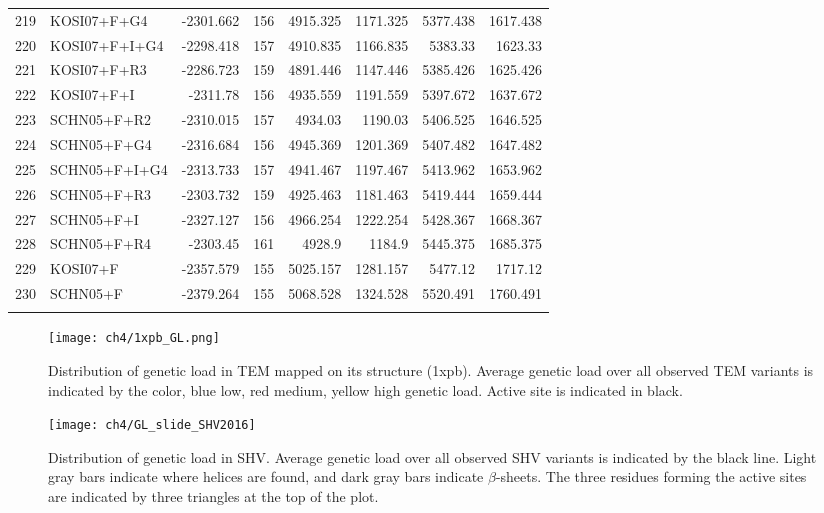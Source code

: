 \begin{longtable}{clrrrrrr}
	219 & KOSI07+F+G4 & -2301.662 & 156 & 4915.325 & 1171.325 & 5377.438 & 1617.438 \\ 
	220 & KOSI07+F+I+G4 & -2298.418 & 157 & 4910.835 & 1166.835 & 5383.33 & 1623.33 \\ 
	221 & KOSI07+F+R3 & -2286.723 & 159 & 4891.446 & 1147.446 & 5385.426 & 1625.426 \\ 
	222 & KOSI07+F+I & -2311.78 & 156 & 4935.559 & 1191.559 & 5397.672 & 1637.672 \\ 
	223 & SCHN05+F+R2 & -2310.015 & 157 & 4934.03 & 1190.03 & 5406.525 & 1646.525 \\ 
	224 & SCHN05+F+G4 & -2316.684 & 156 & 4945.369 & 1201.369 & 5407.482 & 1647.482 \\ 
	225 & SCHN05+F+I+G4 & -2313.733 & 157 & 4941.467 & 1197.467 & 5413.962 & 1653.962 \\ 
	226 & SCHN05+F+R3 & -2303.732 & 159 & 4925.463 & 1181.463 & 5419.444 & 1659.444 \\ 
	227 & SCHN05+F+I & -2327.127 & 156 & 4966.254 & 1222.254 & 5428.367 & 1668.367 \\ 
	228 & SCHN05+F+R4 & -2303.45 & 161 & 4928.9 & 1184.9 & 5445.375 & 1685.375 \\ 
	229 & KOSI07+F & -2357.579 & 155 & 5025.157 & 1281.157 & 5477.12 & 1717.12 \\ 
	230 & SCHN05+F & -2379.264 & 155 & 5068.528 & 1324.528 & 5520.491 & 1760.491 \\ 
  \label{tab:AIC_full}
\end{longtable}



\begin{figure}[H]
     \centering
	\texttt{[image: ch4/1xpb\_GL.png]}
	\caption{Distribution of genetic load in TEM mapped on its structure (1xpb). 
	Average genetic load over all observed TEM variants is indicated by the color, blue low, red medium, yellow high genetic load. Active site is indicated in black.}
	\label{fig:tem2016_3d}
\end{figure}


\begin{figure}[H]
     \centering
	\texttt{[image: ch4/GL\_slide\_SHV2016]}
	\caption{Distribution of genetic load in SHV. 
	Average genetic load over all observed SHV variants is indicated by the black line. 
	Light gray bars indicate where helices are found, and dark gray bars indicate $\beta$-sheets.
	The three residues forming the active sites are indicated by three triangles at the top of the plot.}
	\label{fig:shv2016_sse}
\end{figure}

